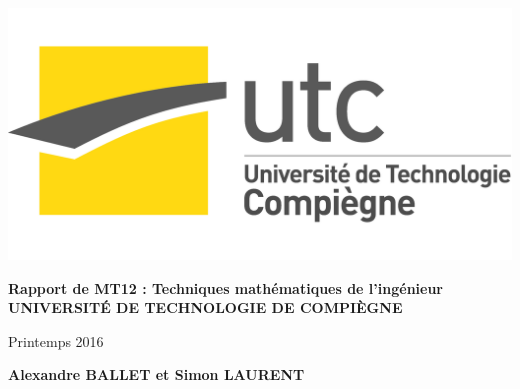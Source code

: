 \documentclass[a4paper,12pt]{report}
\begin{document}

\thispagestyle{empty}

\includegraphics[scale=0.06]{logo_utc.png}

{\large

\vspace*{1cm}

\begin{center}

{\bf Rapport de MT12 : Techniques math\'ematiques de l'ing\'enieur \\ UNIVERSIT\'E DE TECHNOLOGIE DE COMPI\`EGNE}

\vspace*{1 cm}

\vspace*{1cm}

Printemps 2016

\vspace*{1cm}

\vspace*{1cm}
{\Large {\bf Alexandre BALLET et Simon LAURENT}}
\vspace*{2cm}

\vspace*{2 cm}
\end{center}


\vspace*{1 cm}
\\

\vspace*{1 cm}
\\
}
\end{document}

